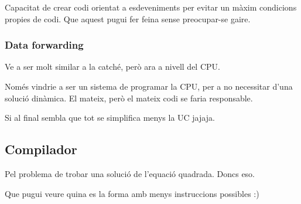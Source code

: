 \documentclass{article}
\begin{document}
Capacitat de crear codi orientat a esdeveniments per evitar un màxim condicions propies de codi. Que aquest pugui fer feina sense preocupar-se gaire.
\subsubsection{Data forwarding}
Ve a ser molt similar a la catché, però ara a nivell del CPU.

Només vindrie a ser un sistema de programar la CPU, per a no necessitar d'una solució dinàmica. El mateix, però el mateix codi se faria responsable.

Si al final sembla que tot se simplifica menys la UC jajaja.

\subsection{Compilador}
Pel problema de trobar una solució de l'equació quadrada. Doncs eso.

Que pugui veure quina es la forma amb menys instruccions possibles :)
\end{document}
